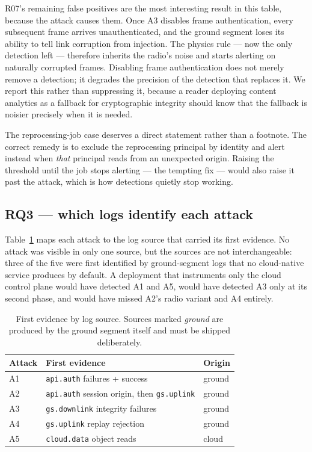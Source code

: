 R07's remaining false positives are the most interesting result in this table,
because the attack causes them. Once A3 disables frame authentication, every
subsequent frame arrives unauthenticated, and the ground segment loses its
ability to tell link corruption from injection. The physics rule --- now the only
detection left --- therefore inherits the radio's noise and starts alerting on
naturally corrupted frames. Disabling frame authentication does not merely remove
a detection; it degrades the precision of the detection that replaces it. We
report this rather than suppressing it, because a reader deploying content
analytics as a fallback for cryptographic integrity should know that the fallback
is noisier precisely when it is needed.

The reprocessing-job case deserves a direct statement rather than a footnote. The correct
remedy is to exclude the reprocessing principal by identity and alert instead when
\emph{that} principal reads from an unexpected origin. Raising the threshold
until the job stops alerting --- the tempting fix --- would also raise it past the
attack, which is how detections quietly stop working.

\subsection{RQ3 --- which logs identify each attack}

Table~\ref{tab:evidence} maps each attack to the log source that carried its
first evidence. No attack was visible in only one source, but the sources are not
interchangeable: three of the five were first identified by ground-segment logs
that no cloud-native service produces by default. A deployment that instruments
only the cloud control plane would have detected A1 and A5, would have detected
A3 only at its second phase, and would have missed A2's radio variant and A4
entirely.

\begin{table}[t]
\centering
\footnotesize
\caption{First evidence by log source. Sources marked \emph{ground} are produced
by the ground segment itself and must be shipped deliberately.}
\label{tab:evidence}
\begin{tabular}{@{}lll@{}}
\toprule
Attack & First evidence & Origin \\
\midrule
A1 & \texttt{api.auth} failures + success & ground \\
A2 & \texttt{api.auth} session origin, then \texttt{gs.uplink} & ground \\
A3 & \texttt{gs.downlink} integrity failures & ground \\
A4 & \texttt{gs.uplink} replay rejection & ground \\
A5 & \texttt{cloud.data} object reads & cloud \\
\bottomrule
\end{tabular}
\end{table}

